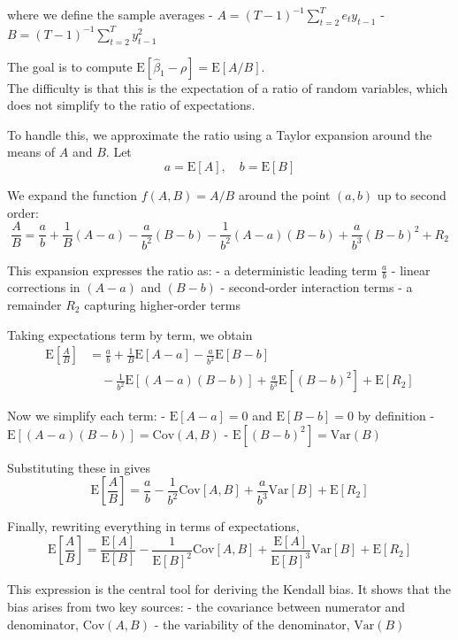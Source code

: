 \documentclass[11pt]{article}
\begin{document}
where we define the sample averages -
\(A = (T-1)^{-1}\sum_{t=2}^{T} e_t y_{t-1}\) -
\(B = (T-1)^{-1}\sum_{t=2}^{T} y_{t-1}^2\)

The goal is to compute
\(\text{E}[\hat\beta_1 - \rho] = \text{E}[A/B]\).\\
The difficulty is that this is the expectation of a ratio of random
variables, which does not simplify to the ratio of expectations.

To handle this, we approximate the ratio using a Taylor expansion around
the means of \(A\) and \(B\). Let \[
a = \text{E}[A], \quad b = \text{E}[B]
\]

We expand the function \(f(A,B) = A/B\) around the point \((a,b)\) up to
second order: \[
\frac{A}{B}=\frac{a}{b}+\frac{1}{B}(A-a)-\frac{a}{b^2}(B-b)-\frac{1}{b^2}(A-a)(B-b)+\frac{a}{b^3}(B-b)^2+R_2
\]

This expansion expresses the ratio as: - a deterministic leading term
\(\frac{a}{b}\) - linear corrections in \((A-a)\) and \((B-b)\) -
second-order interaction terms - a remainder \(R_2\) capturing
higher-order terms

Taking expectations term by term, we obtain \[
\begin{aligned}
\text{E}\left[\frac{A}{B}\right]
&=\frac{a}{b}
+\frac{1}{B}\text{E}\left[A-a\right]
-\frac{a}{b^2}\text{E}\left[B-b\right] \\
&\quad -\frac{1}{b^2}\text{E}\left[(A-a)(B-b)\right]
+\frac{a}{b^3}\text{E}\left[(B-b)^2\right]
+\text{E}\left[R_2\right]
\end{aligned}
\]

Now we simplify each term: - \(\text{E}[A-a] = 0\) and
\(\text{E}[B-b] = 0\) by definition -
\(\text{E}[(A-a)(B-b)] = \text{Cov}(A,B)\) -
\(\text{E}[(B-b)^2] = \text{Var}(B)\)

Substituting these in gives \[
\text{E}\left[\frac{A}{B}\right]
=\frac{a}{b}
-\frac{1}{b^2}\text{Cov}\left[A,B\right]
+\frac{a}{b^3}\text{Var}\left[B\right]
+\text{E}\left[R_2\right]
\]

Finally, rewriting everything in terms of expectations, \[
\text{E}\left[\frac{A}{B}\right]
=\frac{\text{E}[A]}{\text{E}[B]}
-\frac{1}{\text{E}[B]^2}\text{Cov}\left[A,B\right]
+\frac{\text{E}[A]}{\text{E}[B]^3}\text{Var}\left[B\right]
+\text{E}\left[R_2\right]
\]

This expression is the central tool for deriving the Kendall bias. It
shows that the bias arises from two key sources: - the covariance
between numerator and denominator, \(\text{Cov}(A,B)\) - the variability
of the denominator, \(\text{Var}(B)\)
\end{document}
